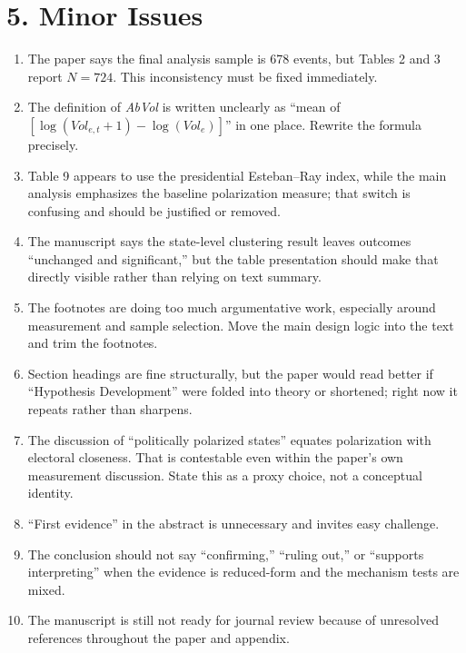 \documentclass[11pt]{article}
\begin{document}
\section*{5. Minor Issues}

\begin{enumerate}[leftmargin=1.5em]
    \item The paper says the final analysis sample is 678 events, but Tables 2 and 3 report $N=724$. This inconsistency must be fixed immediately.
    \item The definition of \textit{AbVol} is written unclearly as ``mean of $[\log(Vol_{e,t}+1)-\log(Vol_e)]$'' in one place. Rewrite the formula precisely.
    \item Table 9 appears to use the presidential Esteban--Ray index, while the main analysis emphasizes the baseline polarization measure; that switch is confusing and should be justified or removed.
    \item The manuscript says the state-level clustering result leaves outcomes ``unchanged and significant,'' but the table presentation should make that directly visible rather than relying on text summary.
    \item The footnotes are doing too much argumentative work, especially around measurement and sample selection. Move the main design logic into the text and trim the footnotes.
    \item Section headings are fine structurally, but the paper would read better if ``Hypothesis Development'' were folded into theory or shortened; right now it repeats rather than sharpens.
    \item The discussion of ``politically polarized states'' equates polarization with electoral closeness. That is contestable even within the paper's own measurement discussion. State this as a proxy choice, not a conceptual identity.
    \item ``First evidence'' in the abstract is unnecessary and invites easy challenge.
    \item The conclusion should not say ``confirming,'' ``ruling out,'' or ``supports interpreting'' when the evidence is reduced-form and the mechanism tests are mixed.
    \item The manuscript is still not ready for journal review because of unresolved references throughout the paper and appendix.
\end{enumerate}
\end{document}
